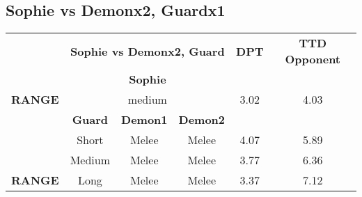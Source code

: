 \subsection{Sophie vs Demonx2, Guardx1}
\begin{table}[H]
\begin{tabular}{c|c|c|c|c|c|}
\cline{2-6}
\rowcolor[HTML]{C0C0C0} 
\cellcolor[HTML]{FFFFFF}\textbf{} & \multicolumn{3}{c|}{\cellcolor[HTML]{C0C0C0}\textbf{Sophie vs Demonx2, Guard}} & \textbf{DPT} & \textbf{TTD Opponent} \\ \cline{2-6} 
 & \multicolumn{3}{c|}{\textbf{Sophie}} & \multicolumn{2}{c|}{} \\ \hline
\multicolumn{1}{|c|}{\cellcolor[HTML]{C0C0C0}\textbf{RANGE}} & \multicolumn{3}{c|}{medium} & 3.02 & 4.03 \\ \hline
 & \textbf{Guard} & \textbf{Demon1} & \textbf{Demon2} & \multicolumn{2}{c|}{} \\ \hline
\multicolumn{1}{|c|}{\cellcolor[HTML]{C0C0C0}} & Short & Melee & Melee & 4.07 & 5.89 \\ \cline{2-6} 
\multicolumn{1}{|c|}{\cellcolor[HTML]{C0C0C0}} & Medium & Melee & Melee & 3.77 & 6.36 \\ \cline{2-6} 
\multicolumn{1}{|c|}{\multirow{-3}{*}{\cellcolor[HTML]{C0C0C0}\textbf{RANGE}}} & Long & Melee & Melee & 3.37 & 7.12 \\ \hline
\end{tabular}
\end{table}

